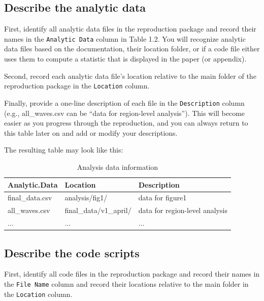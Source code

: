 \documentclass[
  openany]{book}
\begin{document}
\hypertarget{desc-analy}{%
\subsection{Describe the analytic data}\label{desc-analy}}

First, identify all analytic data files in the reproduction package and record their names in the \texttt{Analytic\ Data} column in Table 1.2. You will recognize analytic data files based on the documentation, their location folder, or if a code file either uses them to compute a statistic that is displayed in the paper (or appendix).

Second, record each analytic data file's location relative to the main folder of the reproduction package in the \texttt{Location} column.

Finally, provide a one-line description of each file in the \texttt{Description} column (e.g., all\_waves.csv can be ``data for region-level analysis''). This will become easier as you progress through the reproduction, and you can always return to this table later on and add or modify your descriptions.

The resulting table may look like this:

\begin{table}[!h]

\caption{\label{tab:analysis-data-information}Analysis data information}
\centering
\begin{tabu} to 
\hline
Analytic.Data & Location & Description\\
\hline
final\_data.csv & analysis/fig1/ & data for figure1\\
\hline
all\_waves.csv & final\_data/v1\_april/ & data for region-level analysis\\
\hline
... & ... & ...\\
\hline
\end{tabu}
\end{table}

\hypertarget{desc-scripts}{%
\subsection{Describe the code scripts}\label{desc-scripts}}

First, identify all code files in the reproduction package and record their names in the \texttt{File\ Name} column and record their locations relative to the main folder in the \texttt{Location} column.
\end{document}

